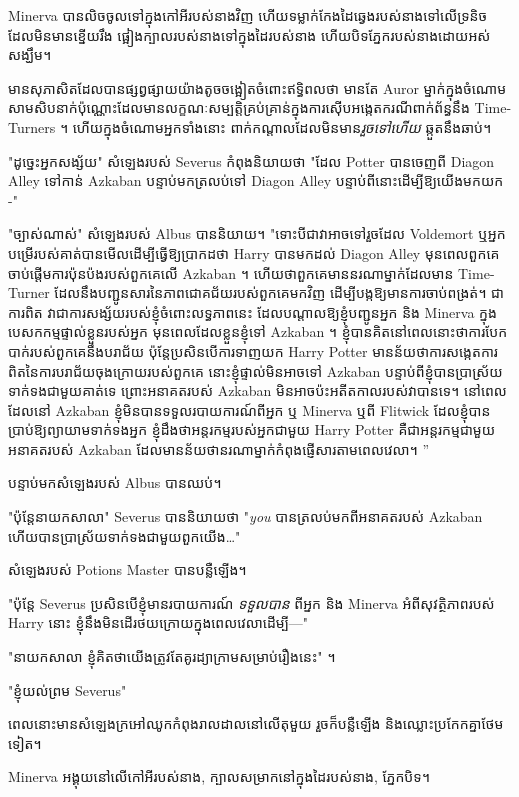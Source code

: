 Minerva បានលិចចូលទៅក្នុងកៅអីរបស់នាងវិញ ហើយទម្លាក់កែងដៃឆ្វេងរបស់នាងទៅលើទ្រនិចដែលមិនមានខ្នើយរឹង ផ្អៀងក្បាលរបស់នាងទៅក្នុងដៃរបស់នាង ហើយបិទភ្នែករបស់នាងដោយអស់សង្ឃឹម។

មានសុភាសិតដែលបានផ្សព្វផ្សាយយ៉ាងតូចចង្អៀតចំពោះឥទ្ធិពលថា មានតែ Auror ម្នាក់ក្នុងចំណោមសាមសិបនាក់ប៉ុណ្ណោះដែលមានលក្ខណៈសម្បត្តិគ្រប់គ្រាន់ក្នុងការស៊ើបអង្កេតករណីពាក់ព័ន្ធនឹង Time-Turners ។ ហើយក្នុងចំណោមអ្នកទាំងនោះ ពាក់កណ្តាលដែលមិនមាន\emph{រួចទៅហើយ} ឆ្កួតនឹងឆាប់។

"ដូច្នេះអ្នកសង្ស័យ" សំឡេងរបស់ Severus កំពុងនិយាយថា "ដែល Potter បានចេញពី Diagon Alley ទៅកាន់ Azkaban បន្ទាប់មកត្រលប់ទៅ Diagon Alley បន្ទាប់ពីនោះដើម្បីឱ្យយើងមកយក -"

"ច្បាស់ណាស់" សំឡេងរបស់ Albus បាននិយាយ។ "ទោះបីជាវាអាចទៅរួចដែល Voldemort ឬអ្នកបម្រើរបស់គាត់បានមើលដើម្បីធ្វើឱ្យប្រាកដថា Harry បានមកដល់ Diagon Alley មុនពេលពួកគេចាប់ផ្តើមការប៉ុនប៉ងរបស់ពួកគេលើ Azkaban ។ ហើយថាពួកគេមាននរណាម្នាក់ដែលមាន Time-Turner ដែលនឹងបញ្ជូនសារនៃភាពជោគជ័យរបស់ពួកគេមកវិញ ដើម្បីបង្កឱ្យមានការចាប់ពង្រត់។ ជាការពិត វាជាការសង្ស័យរបស់ខ្ញុំចំពោះលទ្ធភាពនេះ ដែលបណ្តាលឱ្យខ្ញុំបញ្ជូនអ្នក និង Minerva ក្នុងបេសកកម្មផ្ទាល់ខ្លួនរបស់អ្នក មុនពេលដែលខ្លួនខ្ញុំទៅ Azkaban ។ ខ្ញុំបានគិតនៅពេលនោះថាការបែកបាក់របស់ពួកគេនឹងបរាជ័យ ប៉ុន្តែប្រសិនបើការទាញយក Harry Potter មានន័យថាការសង្កេតការពិតនៃការបរាជ័យចុងក្រោយរបស់ពួកគេ នោះខ្ញុំផ្ទាល់មិនអាចទៅ Azkaban បន្ទាប់ពីខ្ញុំបានប្រាស្រ័យទាក់ទងជាមួយគាត់ទេ ព្រោះអនាគតរបស់ Azkaban មិនអាចប៉ះអតីតកាលរបស់វាបានទេ។ នៅពេលដែលនៅ Azkaban ខ្ញុំមិនបានទទួលរបាយការណ៍ពីអ្នក ឬ Minerva ឬពី Flitwick ដែលខ្ញុំបានប្រាប់ឱ្យព្យាយាមទាក់ទងអ្នក ខ្ញុំដឹងថាអន្តរកម្មរបស់អ្នកជាមួយ Harry Potter គឺជាអន្តរកម្មជាមួយអនាគតរបស់ Azkaban ដែលមានន័យថានរណាម្នាក់កំពុងផ្ញើសារតាមពេលវេលា។ ”

បន្ទាប់មកសំឡេងរបស់ Albus បានឈប់។

"ប៉ុន្តែនាយកសាលា" Severus បាននិយាយថា "\emph{you} បានត្រលប់មកពីអនាគតរបស់ Azkaban ហើយបានប្រាស្រ័យទាក់ទងជាមួយពួកយើង…"

សំឡេងរបស់ Potions Master បានបន្លឺឡើង។

"ប៉ុន្តែ Severus ប្រសិនបើខ្ញុំមានរបាយការណ៍ \emph{ទទួលបាន} ពីអ្នក និង Minerva អំពីសុវត្ថិភាពរបស់ Harry នោះ ខ្ញុំនឹងមិនដើរថយក្រោយក្នុងពេលវេលាដើម្បី—"

"នាយកសាលា ខ្ញុំគិតថាយើងត្រូវតែគូរដ្យាក្រាមសម្រាប់រឿងនេះ" ។

"ខ្ញុំយល់ព្រម Severus"

ពេលនោះ​មាន​សំឡេង​ក្រអៅឈូក​កំពុង​រាលដាល​នៅលើ​តុ​មួយ រួច​ក៏​បន្លឺ​ឡើង និង​ឈ្លោះប្រកែក​គ្នា​ថែមទៀត​។

Minerva អង្គុយនៅលើកៅអីរបស់នាង, ក្បាលសម្រាកនៅក្នុងដៃរបស់នាង, ភ្នែកបិទ។

